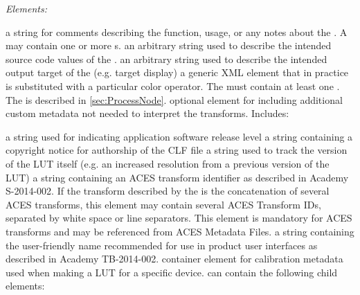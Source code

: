 \emph{Elements:}
\begin{xmlfields}
    \xmlitem[Description][required] a string for comments describing the function, usage, or any notes about the . A  may contain one or more s.
    \xmlitem[InputDescriptor][optional] an arbitrary string used to describe the intended source code values of the .
    \xmlitem[OutputDescriptor][optional] an arbitrary string used to describe the intended output target of the  (e.g. target display)
    \xmlitem[ProcessNode][required] a generic XML element that in practice is substituted with a particular color operator. The  must contain at least one . The  is described in \autoref{sec:ProcessNode}.
    \xmlitem[Info][optional] optional element for including additional custom metadata not needed to interpret the transforms. Includes:
    	\begin{xmlfields}
			\xmlitem[AppRelease][optional] a string used for indicating application software release level
			\xmlitem[Copyright][optional] a string containing a copyright notice for authorship of the CLF file
			\xmlitem[Revision][optional] a string used to track the version of the LUT itself (e.g. an increased resolution from a previous version of the LUT)
            \xmlitem[ACEStransformID][optional] a string containing an ACES transform identifier as described in Academy S-2014-002. If the transform described by the  is the concatenation of several ACES transforms, this element may contain several ACES Transform IDs, separated by white space or line separators. This element is mandatory for ACES transforms and may be referenced from ACES Metadata Files. 
            \xmlitem[ACESuserName][optional] a string containing the user-friendly name recommended for use in product user interfaces as described in Academy TB-2014-002.
            \xmlitem[CalibrationInfo][optional] container element for calibration metadata used when making a LUT for a specific device.  can contain the following child elements:
    			\begin{list}{}{\setlength{\itemsep}{4pt}}
	    			\item {}
		    		\item {}
			    	\item {}
				    \item {}
    				\item {}
	    			\item {}
		    		\item {}
			    \end{list}
    	\end{xmlfields}
\end{xmlfields}